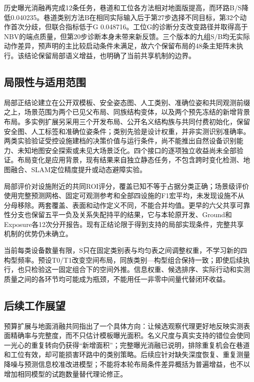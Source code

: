 \documentclass[11pt,a4paper]{article}
\numberwithin{equation}{section}
\begin{document}
历史曝光消融再完成12条任务，巷道和工位各方法相对地面版提高，而环路B/S降低0.040235。巷道类别方法B在相同实际输入后于第27步选择不同目标，第32个动作首次分歧，但联合指标低于G 0.048716。工位G的诊断分支改变路径并取得高于NBV的端点质量，但第20步诊断本身未带来新反馈。三个版本的九组S/B均无实际动作差异，预声明的主比较启动条件未满足，故六个保留布局的48条主矩阵未执行。该结论保留局部语义增益，也明确了当前共享机制的边界。

\hypertarget{ux5c40ux9650ux6027ux4e0eux9002ux7528ux8303ux56f4}{%
\subsection{局限性与适用范围}\label{ux5c40ux9650ux6027ux4e0eux9002ux7528ux8303ux56f4}}

局部正结论建立在公开双模板、安全姿态图、人工类别、准确位姿和共同观测前缀之上，场景范围为两个已见父布局、同族结构变体，以及两个预先冻结的新增背景布局。多实例扩展另采用三个开发布局、公开名义结构族与共同付费初始化，保留安全图、人工标签和准确位姿条件；类别先验是设计权重，并非实测识别准确率。两类实验验证受控设施建档的决策价值与运行条件，尚不能推出自然设备识别能力、未知地图安全探索或未见大场景泛化。四个接口的逐项独立收益尚未全部验证。布局变化是应用背景，现有结果来自独立静态任务，不包含跨时变化检测、地图融合、SLAM定位精度提升或动态避障实验。

局部评价对设施附近的共同ROI评分，覆盖已知不等于占据分类正确；场景级评价使用完整预测网格、固定可观测参考和全部四设施的F1宏平均，未发现设施不从分母移除。两套覆盖、表面和动作定义不同，不能合并均值。更早的六父共享可靠性分支也保留五平一负及关系失配持平的结果，它与本轮原开发、Ground和Exposure各12次分开报告。现有正结论限于得到支持的局部实现条件，完整共享机制的优势仍未确立。

当前每类设备数量有限，S只在固定类别表与均匀表之间调整权重，不学习新的四构型频率。预设T0/T1改变空间布局，同族类别---构型组合保持一致；即使后续执行，也只检验这一固定组合下的空间外推。信息权重、候选排序、实际行动和实测质量之间的各环节均可能成为瓶颈，不能用任一非零中间量代替闭环收益。

\hypertarget{ux540eux7eedux5de5ux4f5cux5c55ux671b}{%
\subsection{后续工作展望}\label{ux540eux7eedux5de5ux4f5cux5c55ux671b}}

预算扩展与地面消融共同指出了一个具体方向：让候选观察代理更好地反映实测表面精确率与完整度，而不只估计模板曝光面积。名义尺度与真实支持的错位会使同一光心的重复转向仍获得``新增面积''；完整曝光消融已说明，排除重复机会在巷道和工位有效，却可能损害环路中的类别策略。后续应针对缺失深度恢复、重复测量降噪与预测信息校准改进模型；不能将本轮布局条件差异概括为普遍增益，也不以增加相同模型的试跑数量替代理论修正。
\end{document}
